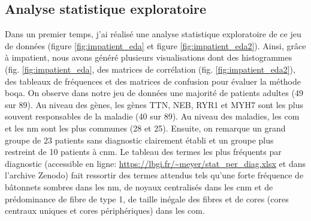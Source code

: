 \subsection{Analyse statistique exploratoire}
Dans un premier temps, j'ai réalisé une analyse statistique exploratoire de ce jeu de données (figure \ref{fig:impatient_eda} et figure \ref{fig:impatient_eda2}). Ainsi, grâce à \gls{impatient}, nous avons généré plusieurs visualisations dont des histogrammes (fig. \ref{fig:impatient_eda}, des matrices de corrélation (fig. \ref{fig:impatient_eda2}), des tableaux de fréquences et des matrices de confusion pour évaluer la méthode \gls{boqa}. On observe dans notre jeu de données une majorité de patients adultes (49 sur 89). Au niveau des gènes, les gènes TTN, NEB, RYR1 et MYH7 sont les plus souvent responsables de la maladie (40 sur 89). Au niveau des maladies, les \gls{com} et les \gls{nm} sont les plus communes (28 et 25). Ensuite, on remarque un grand groupe de 23 patients sans diagnostic clairement établi et un groupe plus restreint de 10 patients à \gls{cnm}. Le tableau des termes les plus fréquents par diagnostic (accessible en ligne: \url{https://lbgi.fr/~meyer/stat_per_diag.xlsx} et dans l'archive Zenodo) fait ressortir des termes attendus tels qu’une forte fréquence de bâtonnets sombres dans les \gls{nm}, de noyaux centralisés dans les \gls{cnm} et de prédominance de fibre de type 1, de taille inégale des fibres et de cores (cores centraux uniques et cores périphériques) dans les \gls{com}.

